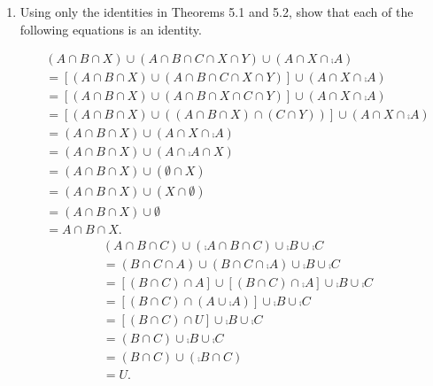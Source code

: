 \documentclass[11pt]{book}
\begin{document}
\begin{enumerate}
\renewcommand{\labelenumii}{(\alph{enumii})}
\item Using only the identities in Theorems 5.1 and 5.2, show that each of the following equations is an identity.
\begin{enumerate}
	{\begin{align*}&(A \cap B \cap X) \cup (A \cap B \cap C \cap X \cap Y) \cup (A \cap X \cap \comp{A})\\&= [(A \cap B \cap X) \cup (A \cap B \cap C \cap X \cap Y)] \cup (A \cap X \cap \comp{A})\\&= [(A \cap B \cap X) \cup (A \cap B \cap X \cap C \cap Y)] \cup (A \cap X \cap \comp{A})\\&= [(A \cap B \cap X) \cup ((A \cap B \cap X) \cap (C \cap Y))] \cup (A \cap X \cap \comp{A})\\&= (A \cap B \cap X) \cup (A \cap X \cap \comp{A})\\&= (A \cap B \cap X) \cup (A \cap \comp{A} \cap X)\\&= (A \cap B \cap X) \cup (\emptyset \cap X)\\&= (A \cap B \cap X) \cup (X \cap \emptyset)\\&= (A \cap B \cap X) \cup \emptyset\\&= A \cap B \cap X.\end{align*}}
	{\begin{align*}&(A \cap B \cap C) \cup (\comp{A} \cap B \cap C) \cup \comp{B} \cup \comp{C}\\&= (B \cap C \cap A) \cup (B \cap C \cap \comp{A}) \cup \comp{B} \cup \comp{C}\\&= [(B \cap C) \cap A] \cup [(B \cap C) \cap \comp{A}] \cup \comp{B} \cup \comp{C}\\&= [(B \cap C) \cap (A \cup \comp{A})] \cup \comp{B} \cup \comp{C}\\&= [(B \cap C) \cap U] \cup \comp{B} \cup \comp{C}\\&= (B \cap C) \cup \comp{B} \cup \comp{C}\\&= (B \cap C) \cup (\comp{B \cap C})\\&= U.\end{align*}}

\end{enumerate}
\end{enumerate}
\end{document}
